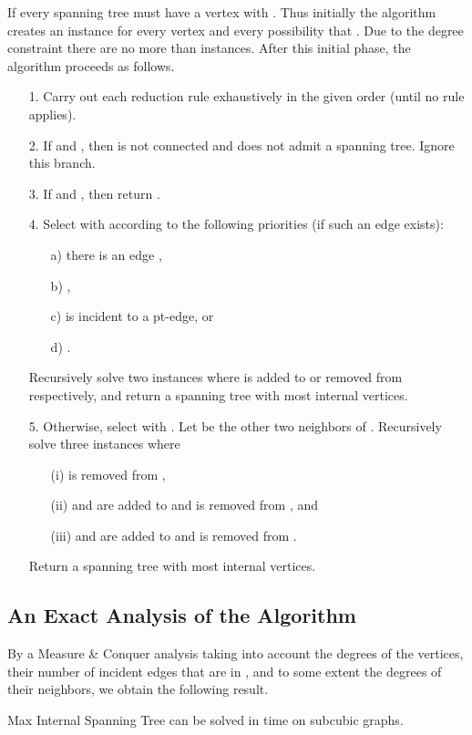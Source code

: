 \documentclass{llncs}
\newcommand{\longversion}[1]{#1}
\begin{document}
{If  every spanning tree  must have a vertex  with . Thus initially the algorithm creates an instance for every vertex  and every possibility that . Due to the degree constraint there are no more than  instances. After this initial phase, the algorithm proceeds as follows.

\begin{enumerate}
 \item[1.] Carry out each reduction rule exhaustively in the given order (until no rule applies).
 \item[2.] If  and , then  is not connected and does not admit a spanning tree. Ignore this branch.
 \item[3.] If  and , then return .
 \item[4.] Select  with  according to the following priorities (if such an edge exists):
  \begin{itemize}
   \item[a)] there is an edge ,
   \item[b)] ,
   \item[c)]  is incident to a pt-edge, or
   \item[d)] .
  \end{itemize}
  Recursively solve two instances where  is added to  or removed from  respectively, and return a spanning tree with most internal vertices.
 \item[5.] Otherwise, select  with . Let  be the other two neighbors of . Recursively solve three instances where 
  \begin{itemize}
   \item[(i)]  is removed from ,
   \item[(ii)]  and  are added to  and  is removed from , and
   \item[(iii)]  and  are added to  and  is removed from .
  \end{itemize}
  Return a spanning tree with most internal vertices.
\end{enumerate}

\longversion{\subsection{An Exact Analysis of the Algorithm}}

By a Measure \& Conquer analysis taking into account the degrees of the vertices, their number of incident edges that are in , and to some extent
the degrees of their neighbors, 
we obtain the following result.

\begin{theorem}\label{thm:exalg}
{\sc Max Internal Spanning Tree} can be solved in time  on subcubic graphs.
\end{theorem}



}
\end{document}

